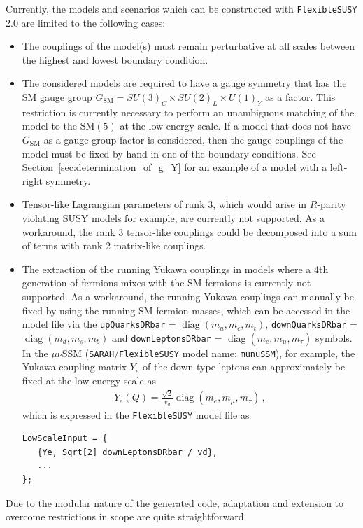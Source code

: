 \documentclass[final,3p,11pt,pdflatex]{elsarticle}
\makeatletter
\newcommand{\modelname}[1]{\texttt{#1}\@\xspace}
\newcommand{\sarah}{\texttt{SARAH}\@\xspace}
\newcommand{\fs}{\texttt{FlexibleSUSY}\@\xspace}
\newcommand{\fstwo}{\fs 2.0\@\xspace}
\newcommand{\code}[1]{\lstinline|#1|}  %
\newcommand{\SM}{\ensuremath{\text{SM}}\xspace}
\newcommand{\secref}[1]{Section~\ref{#1}}
\newcommand{\GSM}{\ensuremath{G_{\SM}}\xspace}
\DeclareMathOperator{\diag}{diag}
\makeatother
\begin{document}
Currently, the models and scenarios which can be constructed with
\fstwo are limited to the following cases:
%
\begin{itemize}
\item The couplings of the model(s) must remain perturbative at all
  scales between the highest and lowest boundary condition.
\item The considered models are required to have a gauge symmetry
  that has the SM gauge group
  $\GSM = SU(3)_C\times SU(2)_L\times U(1)_Y$ as a factor.  This
  restriction is currently necessary to perform an unambiguous
  matching of the model to the $\SM(5)$ at the low-energy scale.  If a
  model that does not have $\GSM$ as a gauge group
  factor is considered, then the gauge couplings of the model must be fixed
  by hand in one of the boundary conditions.  See
  \secref{sec:determination_of_g_Y} for an example of a model with a
  left-right symmetry.
\item Tensor-like Lagrangian parameters of rank 3, which would arise
  in $R$-parity violating SUSY models for example, are currently not
  supported.  As a workaround, the rank 3 tensor-like couplings could
  be decomposed into a sum of terms with rank 2 matrix-like couplings.
\item The extraction of the running Yukawa couplings in models where
  a 4th generation of fermions mixes with the SM fermions is currently
  not supported.  As a workaround, the running Yukawa couplings can
  manually be fixed by using the running SM fermion masses, which can
  be accessed in the model file via the \code{upQuarksDRbar} =
  $\diag(m_u, m_c, m_t)$, \code{downQuarksDRbar} =
  $\diag(m_d, m_s, m_b)$ and \code{downLeptonsDRbar} =
  $\diag(m_e, \allowbreak m_\mu, \allowbreak m_\tau)$ symbols.  In the
  $\mu\nu$SSM \cite{LopezFogliani:2005yw} (\sarah/\fs model name:
  \modelname{munuSSM}), for example, the Yukawa coupling matrix $Y_e$ of
  the down-type leptons can approximately be fixed at the low-energy
  scale as
  \begin{align}
    Y_e(Q) = \frac{\sqrt{2}}{v_d} \diag(m_e, m_\mu, m_\tau) \,,
  \end{align}
  which is expressed in the \fs model file as
  \begin{lstlisting}
LowScaleInput = {
   {Ye, Sqrt[2] downLeptonsDRbar / vd},
   ...
};
  \end{lstlisting}
\end{itemize}
%
Due to the modular nature of the generated code, adaptation and extension
to overcome restrictions in scope are quite straightforward.
\end{document}
